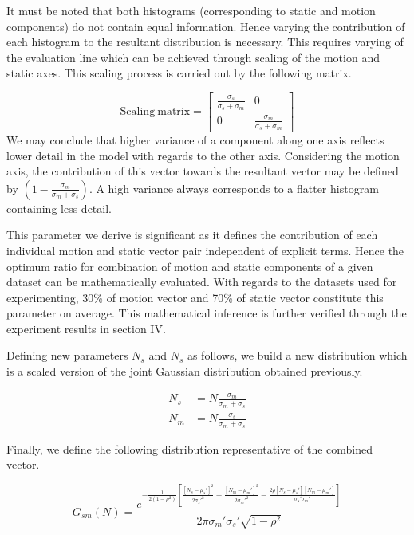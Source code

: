 It must be noted that both histograms (corresponding to static and motion components) do not contain equal information. Hence varying the contribution of each histogram to the resultant distribution is necessary. This requires varying of the evaluation line which can be achieved through scaling of the motion and static axes. This scaling process is carried out by the following matrix.



\[\mathrm{Scaling~matrix} =
\begin{bmatrix}
    \frac {\sigma_s}{\sigma_s + \sigma_m} & 0  \\
    0 & \frac {\sigma_m}{\sigma_s + \sigma_m}
\end{bmatrix}
\]
We may conclude that higher variance of a component along one axis reflects lower detail in the model with regards to the other axis. Considering the motion axis, the contribution of this vector towards the resultant vector may be defined by $(1-\frac{\sigma_m}{\sigma_m+\sigma_s})$. A high variance always corresponds to a flatter histogram containing less detail.

This parameter we derive is significant as it defines the contribution of each individual motion and static vector pair independent of explicit terms. Hence the optimum ratio for combination of motion and static components of a given dataset can be mathematically evaluated. With regards to the datasets used for experimenting, 30\% of motion
vector and 70\% of static vector constitute this parameter on average. This mathematical inference is further verified through the experiment results in section IV.

Defining new parameters $N_s$ and $N_s$ as follows, we build a new distribution which is a scaled version of the joint Gaussian distribution obtained previously.

\begin{align*}
N_s &= N \frac{\sigma_m}{\sigma_m+\sigma_s}  \\
N_m &= N \frac{\sigma_s}{\sigma_m+\sigma_s}
\end{align*}

Finally, we define the following distribution representative of the combined vector.

\begin{equation}
G_{sm}(N)= \frac{e^{-\frac{1}{2(1-\rho^2)}\left[\frac{[N_s-\mu_s']^2}{2\sigma_s'^2} + \frac{[N_m-\mu_m']^2}{2\sigma_m'^2} - \frac{2\rho[N_s-\mu_s'][N_m-\mu_m']}{\sigma_s' \sigma_m'}  \right]}}{2\pi\sigma_m'\sigma_s'\sqrt{1-\rho^2}}
\end{equation}

